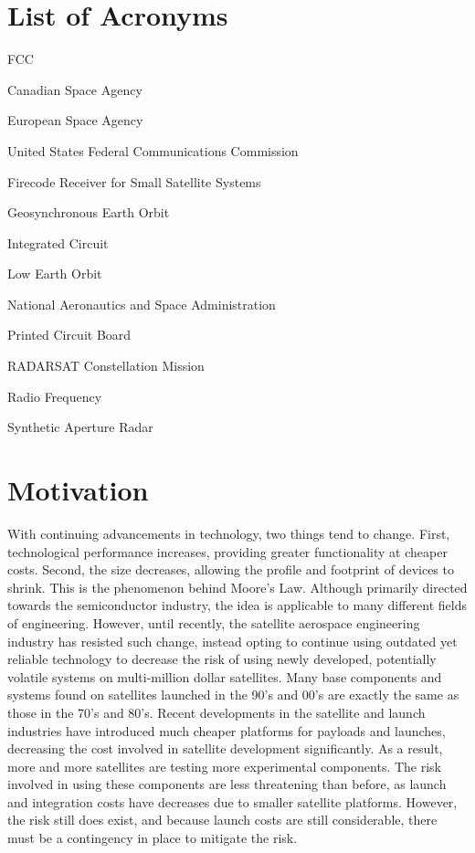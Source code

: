 \documentclass[12pt, twoside]{report}
\begin{document}
\chapter*{List of Acronyms}
\begin{labeling}{FCC}
\item [\textbf{CSA}] Canadian Space Agency
\item [\textbf{ESA}] European Space Agency
\item [\textbf{FCC}] United States Federal Communications Commission
\item [\textbf{FRS3}] Firecode Receiver for Small Satellite Systems
\item [\textbf{GEO}] Geosynchronous Earth Orbit
\item [\textbf{IC}] Integrated Circuit
\item [\textbf{LEO}] Low Earth Orbit
\item [\textbf{NASA}] National Aeronautics and Space Administration
\item [\textbf{PCB}] Printed Circuit Board
\item [\textbf{RCM}] RADARSAT Constellation Mission
\item [\textbf{RF}] Radio Frequency
\item [\textbf{SAR}] Synthetic Aperture Radar

\end{labeling}

\tableofcontents

\chapter{Motivation}
\par With continuing advancements in technology, two things tend to change.
First, technological performance increases, providing greater functionality at cheaper costs.
Second, the size decreases, allowing the profile and footprint of devices to shrink.
This is the phenomenon behind Moore's Law.
Although primarily directed towards the semiconductor industry, the idea is applicable to many different fields of engineering.
However, until recently, the satellite aerospace engineering industry has resisted such change, instead opting to continue using outdated yet reliable technology to decrease the risk of using newly developed, potentially volatile systems on multi-million dollar satellites.
Many base components and systems found on satellites launched in the 90's and 00's are exactly the same as those in the 70's and 80's.
Recent developments in the satellite and launch industries have introduced much cheaper platforms for payloads and launches, decreasing the cost involved in satellite development significantly.
As a result, more and more satellites are testing more experimental components.
The risk involved in using these components are less threatening than before, as launch and integration costs have decreases due to smaller satellite platforms.
However, the risk still does exist, and because launch costs are still considerable, there must be a contingency in place to mitigate the risk.
\end{document}
